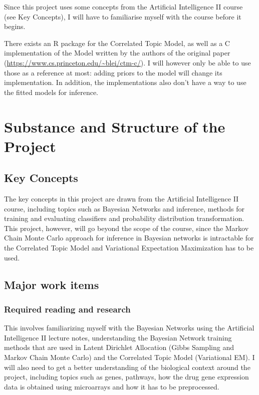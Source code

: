 \documentclass[12pt,a4]{article}
\begin{document}
Since this project uses some concepts from the Artificial Intelligence II course (see Key Concepts), I will have to familiarise myself with the course before it begins.

There exists an R package for the Correlated Topic Model, as well as a C implementation of the Model written by the authors of the original paper (\url{https://www.cs.princeton.edu/~blei/ctm-c/}). I will however only be able to use those as a reference at most: adding priors to the model will change its implementation. In addition, the implementations also don't have a way to use the fitted models for inference.

\section*{Substance and Structure of the Project}

\subsection*{Key Concepts}

The key concepts in this project are drawn from the Artificial Intelligence II course, including topics such as Bayesian Networks and inference, methods for training and evaluating classifiers and probability distribution transformation. This project, however, will go beyond the scope of the course, since the Markov Chain Monte Carlo approach for inference in Bayesian networks is intractable for the Correlated Topic Model and Variational Expectation Maximization has to be used.

\subsection*{Major work items}

\subsubsection*{Required reading and research}
This involves familiarizing myself with the Bayesian Networks using the Artificial Intelligence II lecture notes, understanding the Bayesian Network training methods that are used in Latent Dirichlet Allocation (Gibbs Sampling and Markov Chain Monte Carlo) and the Correlated Topic Model (Variational EM). I will also need to get a better understanding of the biological context around the project, including topics such as genes, pathways, how the drug gene expression data is obtained using microarrays and how it has to be preprocessed.
\end{document}
